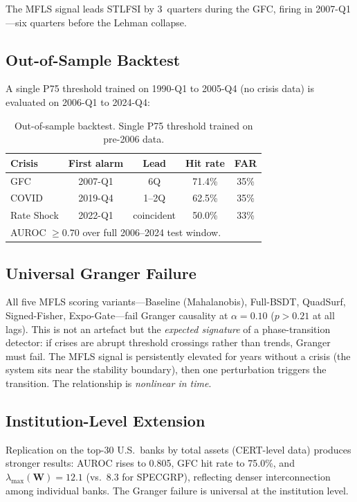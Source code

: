 \documentclass[final]{siamltex}
\newcommand{\lmax}{\lambda_{\max}}
\begin{document}
The MFLS signal leads STLFSI by 3~quarters during the GFC, firing
in 2007-Q1---six quarters before the Lehman collapse.

\subsection{Out-of-Sample Backtest}

A single P75 threshold trained on 1990-Q1 to 2005-Q4 (no crisis
data) is evaluated on 2006-Q1 to 2024-Q4:

\begin{table}[htbp]
\centering
\caption{Out-of-sample backtest. Single P75 threshold trained on pre-2006
data.}
\label{tab:oos}
\begin{tabular}{lcccc}
\toprule
Crisis & First alarm & Lead & Hit rate & FAR\\
\midrule
GFC         & 2007-Q1 & 6Q & 71.4\% & 35\%\\
COVID       & 2019-Q4 & 1--2Q & 62.5\% & 35\%\\
Rate Shock  & 2022-Q1 & coincident & 50.0\% & 33\%\\
\midrule
\multicolumn{5}{l}{\small AUROC $\ge 0.70$ over full 2006--2024 test
window.}\\
\bottomrule
\end{tabular}
\end{table}

\subsection{Universal Granger Failure}

All five MFLS scoring variants---Baseline (Mahalanobis),
Full-BSDT, QuadSurf, Signed-Fisher, Expo-Gate---fail Granger causality
at $\alpha=0.10$ ($p>0.21$ at all lags). This is not an artefact
but the \emph{expected signature} of a phase-transition detector:
if crises are abrupt threshold crossings rather than trends,
Granger must fail. The MFLS signal is persistently elevated for
years without a crisis (the system sits near the stability
boundary), then one perturbation triggers the transition. The
relationship is \emph{nonlinear in time}.

\subsection{Institution-Level Extension}

Replication on the top-30 U.S.\ banks by total assets (CERT-level
data) produces stronger results: AUROC rises to 0.805, GFC hit
rate to 75.0\%, and $\lmax(\mathbf{W})=12.1$ (vs.\ 8.3 for
SPECGRP), reflecting denser interconnection among individual banks.
The Granger failure is universal at the institution level.
\end{document}
